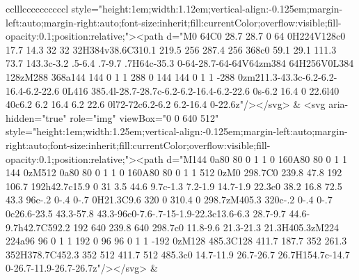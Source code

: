 \documentclass[
]{article}
\begin{document}
\begin{figure*}
\begin{longtable*}{cclllccccccccccl}
style="height:1em;width:1.12em;vertical-align:-0.125em;margin-left:auto;margin-right:auto;font-size:inherit;fill:currentColor;overflow:visible;fill-opacity:0.1;position:relative;"><path d="M0 64C0 28.7 28.7 0 64 0H224V128c0 17.7 14.3 32 32 32H384v38.6C310.1 219.5 256 287.4 256 368c0 59.1 29.1 111.3 73.7 143.3c-3.2 .5-6.4 .7-9.7 .7H64c-35.3 0-64-28.7-64-64V64zm384 64H256V0L384 128zM288 368a144 144 0 1 1 288 0 144 144 0 1 1 -288 0zm211.3-43.3c-6.2-6.2-16.4-6.2-22.6 0L416 385.4l-28.7-28.7c-6.2-6.2-16.4-6.2-22.6 0s-6.2 16.4 0 22.6l40 40c6.2 6.2 16.4 6.2 22.6 0l72-72c6.2-6.2 6.2-16.4 0-22.6z"/></svg> & <svg aria-hidden="true" role="img" viewBox="0 0 640 512" style="height:1em;width:1.25em;vertical-align:-0.125em;margin-left:auto;margin-right:auto;font-size:inherit;fill:currentColor;overflow:visible;fill-opacity:0.1;position:relative;"><path d="M144 0a80 80 0 1 1 0 160A80 80 0 1 1 144 0zM512 0a80 80 0 1 1 0 160A80 80 0 1 1 512 0zM0 298.7C0 239.8 47.8 192 106.7 192h42.7c15.9 0 31 3.5 44.6 9.7c-1.3 7.2-1.9 14.7-1.9 22.3c0 38.2 16.8 72.5 43.3 96c-.2 0-.4 0-.7 0H21.3C9.6 320 0 310.4 0 298.7zM405.3 320c-.2 0-.4 0-.7 0c26.6-23.5 43.3-57.8 43.3-96c0-7.6-.7-15-1.9-22.3c13.6-6.3 28.7-9.7 44.6-9.7h42.7C592.2 192 640 239.8 640 298.7c0 11.8-9.6 21.3-21.3 21.3H405.3zM224 224a96 96 0 1 1 192 0 96 96 0 1 1 -192 0zM128 485.3C128 411.7 187.7 352 261.3 352H378.7C452.3 352 512 411.7 512 485.3c0 14.7-11.9 26.7-26.7 26.7H154.7c-14.7 0-26.7-11.9-26.7-26.7z"/></svg> &  \\ 

\end{longtable*}
\end{figure*}
\end{document}
